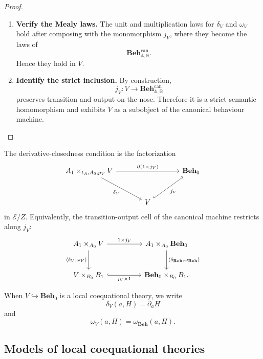 \begin{proof}
\begin{enumerate}
        \item \textbf{Verify the Mealy laws.}
        The unit and multiplication laws for \(\delta_V\) and \(\omega_V\)
        hold after composing with the monomorphism \(j_V\), where they become
        the laws of
        \[
            \mathbf{Beh}^{\mathrm{can}}_{\mathbb A,\mathbb B}.
        \]
        Hence they hold in \(V\).

        \item \textbf{Identify the strict inclusion.}
        By construction,
        \[
            j_V:V\to\mathbf{Beh}^{\mathrm{can}}_{\mathbb A,\mathbb B}
        \]
        preserves transition and output on the nose. Therefore it is a strict
        semantic homomorphism and exhibits \(V\) as a subobject of the
        canonical behaviour machine.
    \end{enumerate}
\end{proof}

The derivative-closedness condition is the factorization
\[
\begin{tikzcd}[column sep=large, row sep=large]
    A_1\times_{t_A,A_0,p_V}V
        \arrow[rr, "{\partial(1\times j_V)}"]
        \arrow[dr, "\delta_V"']
    &&
    \mathbf{Beh}_0
    \\
    &
    V
        \arrow[ur, hook, "j_V"']
    &
\end{tikzcd}
\]
in \(\mathcal E/Z\). Equivalently, the transition-output cell of the canonical
machine restricts along \(j_V\):
\[
\begin{tikzcd}[column sep=huge, row sep=large]
    A_1\times_{A_0}V
        \arrow[r, "{1\times j_V}"]
        \arrow[d, "{\langle\delta_V,\omega_V\rangle}"']
    &
    A_1\times_{A_0}\mathbf{Beh}_0
        \arrow[d, "{\langle\delta_{\mathbf{Beh}},\omega_{\mathbf{Beh}}\rangle}"]
    \\
    V\times_{B_0}B_1
        \arrow[r, hook, "{j_V\times 1}"']
    &
    \mathbf{Beh}_0\times_{B_0}B_1 .
\end{tikzcd}
\]

When \(V\hookrightarrow\mathbf{Beh}_0\) is a local coequational theory, we write
\[
    \delta_V(a,H)=\partial_aH
\]
and
\[
    \omega_V(a,H)=\omega_{\mathbf{Beh}}(a,H).
\]

\subsection{Models of local coequational theories}
\label{subsec:models-local-coequational-theories}

